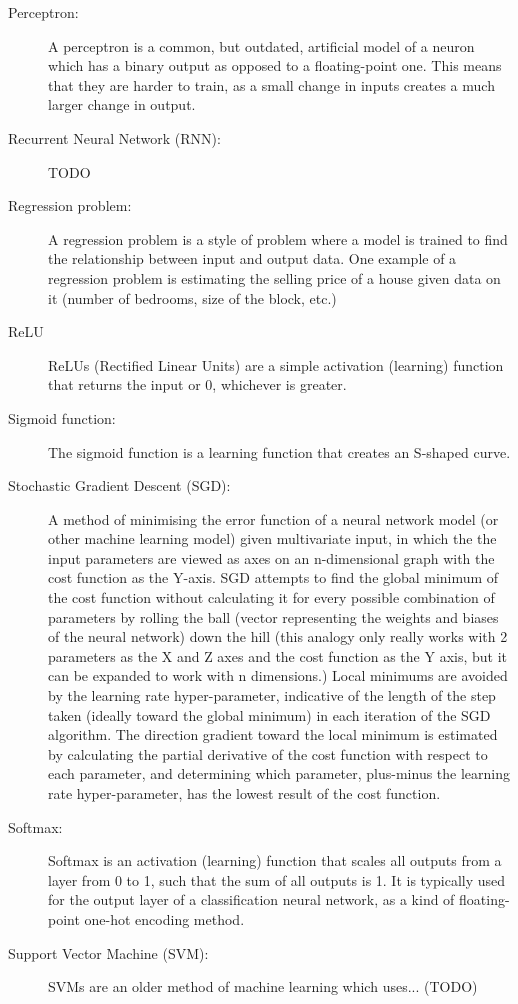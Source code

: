 \documentclass[]{report}
\begin{document}
\begin{description}
\item[Perceptron:] A perceptron is a common, but outdated, artificial model of a neuron which has a binary output as opposed to a floating-point one. This means that they are harder to train, as a small change in inputs creates a much larger change in output.

\item[Recurrent Neural Network (RNN):] TODO

\item[Regression problem:] A regression problem is a style of problem where a model is trained to find the relationship between input and output data. One example of a regression problem is estimating the selling price of a house given data on it (number of bedrooms, size of the block, etc.)	

\item[ReLU] ReLUs (Rectified Linear Units) are a simple activation (learning) function that returns the input or 0, whichever is greater.

\item[Sigmoid function:] The sigmoid function is a learning function that creates an S-shaped curve.

\label{itm:SGD}
\item[Stochastic Gradient Descent (SGD):] A method of minimising the error function of a neural network model (or other machine learning model) given multivariate input, in which the the input parameters are viewed as axes on an n-dimensional graph with the cost function as the Y-axis. SGD attempts to find the global minimum of the cost function without calculating it for every possible combination of parameters by rolling the ball (vector representing the weights and biases of the neural network) down the hill (this analogy only really works with 2 parameters as the X and Z axes and the cost function as the Y axis, but it can be expanded to work with n dimensions.) Local minimums are avoided by the learning rate hyper-parameter, indicative of the length of the step taken (ideally toward the global minimum) in each iteration of the SGD algorithm. The direction gradient toward the local minimum is estimated by calculating the partial derivative of the cost function with respect to each parameter, and determining which parameter, plus-minus the learning rate hyper-parameter, has the lowest result of the cost function.

\item[Softmax:] Softmax is an activation (learning) function that scales all outputs from a layer from 0 to 1, such that the sum of all outputs is 1. It is typically used for the output layer of a classification neural network, as a kind of floating-point one-hot encoding method.

\item[Support Vector Machine (SVM):] SVMs are an older method of machine learning which uses... (TODO)
\end{description}
\onecolumn

\printbibliography
\end{document}

